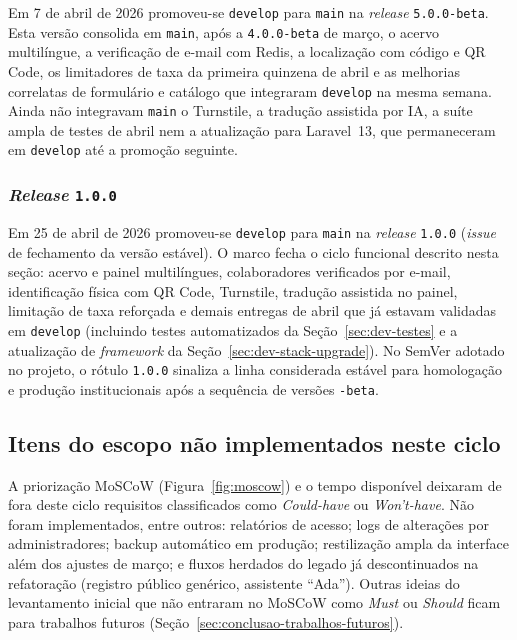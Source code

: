 Em 7 de abril de 2026 promoveu-se \texttt{develop} para \texttt{main} na \textit{release} \texttt{5.0.0-beta}. Esta versão consolida em \texttt{main}, após a \texttt{4.0.0-beta} de março, o acervo multilíngue, a verificação de e-mail com Redis, a localização com código e QR Code, os limitadores de taxa da primeira quinzena de abril e as melhorias correlatas de formulário e catálogo que integraram \texttt{develop} na mesma semana. Ainda não integravam \texttt{main} o Turnstile, a tradução assistida por IA, a suíte ampla de testes de abril nem a atualização para Laravel~13, que permaneceram em \texttt{develop} até a promoção seguinte.


\subsubsection{\textit{Release} \texttt{1.0.0}}\label{sec:dev-release-100}

Em 25 de abril de 2026 promoveu-se \texttt{develop} para \texttt{main} na \textit{release} \texttt{1.0.0} (\textit{issue} de fechamento da versão estável). O marco fecha o ciclo funcional descrito nesta seção: acervo e painel multilíngues, colaboradores verificados por e-mail, identificação física com QR Code, Turnstile, tradução assistida no painel, limitação de taxa reforçada e demais entregas de abril que já estavam validadas em \texttt{develop} (incluindo testes automatizados da Seção~\ref{sec:dev-testes} e a atualização de \textit{framework} da Seção~\ref{sec:dev-stack-upgrade}). No SemVer adotado no projeto, o rótulo \texttt{1.0.0} sinaliza a linha considerada estável para homologação e produção institucionais após a sequência de versões \texttt{-beta}.


\subsection{Itens do escopo não implementados neste ciclo}\label{sec:dev-func-escopo-nao}

A priorização MoSCoW (Figura~\ref{fig:moscow}) e o tempo disponível deixaram de fora deste ciclo requisitos classificados como \textit{Could-have} ou \textit{Won't-have}. Não foram implementados, entre outros: relatórios de acesso; logs de alterações por administradores; backup automático em produção; restilização ampla da interface além dos ajustes de março; e fluxos herdados do legado já descontinuados na refatoração (registro público genérico, assistente ``Ada''). Outras ideias do levantamento inicial que não entraram no MoSCoW como \textit{Must} ou \textit{Should} ficam para trabalhos futuros (Seção~\ref{sec:conclusao-trabalhos-futuros}).


